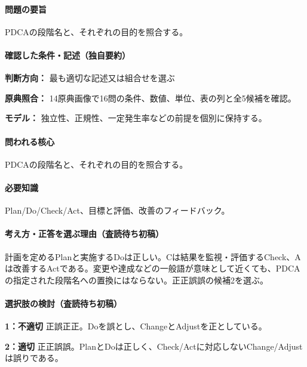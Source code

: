\paragraph{問題の要旨} PDCAの段階名と、それぞれの目的を照合する。

\paragraph{確認した条件・記述（独自要約）}\mbox{}\par

\noindent\textbf{判断方向：} 最も適切な記述又は組合せを選ぶ\par

\noindent\textbf{原典照合：} 14原典画像で16問の条件、数値、単位、表の列と全5候補を確認。\par

\noindent\textbf{モデル：} 独立性、正規性、一定発生率などの前提を個別に保持する。\par

\paragraph{問われる核心} PDCAの段階名と、それぞれの目的を照合する。

\paragraph{必要知識} Plan/Do/Check/Act、目標と評価、改善のフィードバック。

\paragraph{考え方・正答を選ぶ理由（査読待ち初稿）} 計画を定めるPlanと実施するDoは正しい。Cは結果を監視・評価するCheck、Aは改善するActである。変更や達成などの一般語が意味として近くても、PDCAの指定された段階名への置換にはならない。正正誤誤の候補2を選ぶ。

\paragraph{選択肢の検討（査読待ち初稿）}\mbox{}\par

\noindent\textbf{1：不適切} 正誤正正。Doを誤とし、ChangeとAdjustを正としている。\par

\noindent\textbf{2：適切} 正正誤誤。PlanとDoは正しく、Check/Actに対応しないChange/Adjustは誤りである。\par

